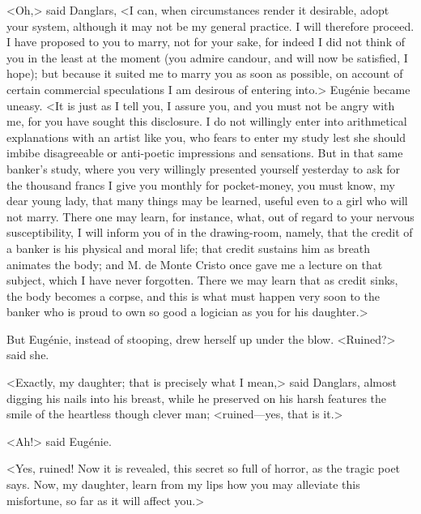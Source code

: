  <Oh,> said Danglars, <I can, when circumstances render it desirable, adopt your system, although it may not be my general practice. I will therefore proceed. I have proposed to you to marry, not for your sake, for indeed I did not think of you in the least at the moment (you admire candour, and will now be satisfied, I hope); but because it suited me to marry you as soon as possible, on account of certain commercial speculations I am desirous of entering into.> Eugénie became uneasy.  <It is just as I tell you, I assure you, and you must not be angry with me, for you have sought this disclosure. I do not willingly enter into arithmetical explanations with an artist like you, who fears to enter my study lest she should imbibe disagreeable or anti-poetic impressions and sensations. But in that same banker's study, where you very willingly presented yourself yesterday to ask for the thousand francs I give you monthly for pocket-money, you must know, my dear young lady, that many things may be learned, useful even to a girl who will not marry. There one may learn, for instance, what, out of regard to your nervous susceptibility, I will inform you of in the drawing-room, namely, that the credit of a banker is his physical and moral life; that credit sustains him as breath animates the body; and M. de Monte Cristo once gave me a lecture on that subject, which I have never forgotten. There we may learn that as credit sinks, the body becomes a corpse, and this is what must happen very soon to the banker who is proud to own so good a logician as you for his daughter.> 

 But Eugénie, instead of stooping, drew herself up under the blow. <Ruined?> said she. 

 <Exactly, my daughter; that is precisely what I mean,> said Danglars, almost digging his nails into his breast, while he preserved on his harsh features the smile of the heartless though clever man; <ruined—yes, that is it.> 

 <Ah!> said Eugénie. 

 <Yes, ruined! Now it is revealed, this secret so full of horror, as the tragic poet says. Now, my daughter, learn from my lips how you may alleviate this misfortune, so far as it will affect you.> 

